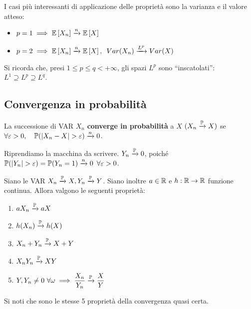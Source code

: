 I casi più interessanti di applicazione delle proprietà sono la varianza e il valore atteso:
\begin{itemize}
	\item $p = 1 \implies \mathbb E \left[ X_n \right] \xrightarrow{n} \mathbb E \left[ X \right]$
	\item $p = 2 \implies \mathbb E \left[ X_n \right] \xrightarrow{n} \mathbb E \left[ X \right], \enspace Var(X_n) \xrightarrow{L^p} Var(X)$
\end{itemize}

\begin{nb} Si ricorda che, presi $1 \le p \le q < +\infty$, gli spazi $L^p$ sono ``inscatolati'': $L^1 \supseteq L^p \supseteq L^q$.
\end{nb}

\subsection{Convergenza in probabilità}
\begin{defn}
  La successione di VAR $X_n$ \textbf{converge in probabilità} a $X$ $(X_n \xrightarrow{\mathbb P} X)$
  se $\forall \varepsilon > 0, \quad \mathbb P(|X_n - X| > \varepsilon) \xrightarrow{n} 0$.
\end{defn}

\medskip
\begin{ese}
  Riprendiamo la macchina da scrivere.
  $Y_n \xrightarrow{\mathbb P} 0$, poiché $\mathbb P(|Y_n| > \varepsilon) = \mathbb P(Y_n = 1) \xrightarrow{n} 0 \enspace \forall \varepsilon > 0$.
\end{ese}

\medskip
\begin{prop}
  Siano le VAR $X_n \xrightarrow{\mathbb P} X, Y_n \xrightarrow{\mathbb P} Y$. Siano inoltre $a \in \mathbb R$ e $h: \mathbb R \to \mathbb R$ funzione continua. Allora valgono le seguenti proprietà:
  \begin{enumerate}
    \item $a X_n \xrightarrow{\mathbb P} aX$
    \item $h(X_n) \xrightarrow{\mathbb P} h(X)$
    \item $X_n + Y_n \xrightarrow{\mathbb P} X + Y$
    \item $X_n Y_n \xrightarrow{\mathbb P} XY$
    \item $Y, Y_n \neq 0 \ \forall \omega \implies \dfrac {X_n} {Y_n} \xrightarrow{\mathbb P} \dfrac X Y$
  \end{enumerate}
\end{prop}
Si noti che sono le stesse 5 proprietà della convergenza quasi certa.

